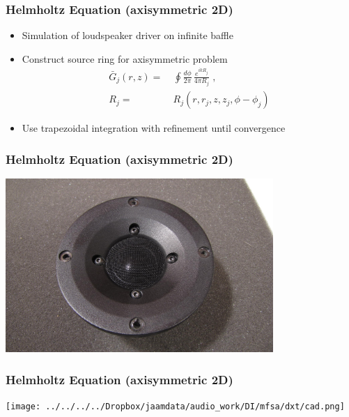 \begin{frame}
  \frametitle{Helmholtz Equation (axisymmetric 2D)\\
    }
  \begin{itemize}
  \item Simulation of loudspeaker driver on infinite baffle
  \item Construct source ring for axisymmetric problem
    \begin{align*}
      \bar{G}_j(r,z) = &~\oint \frac{d\phi}{2\pi} \, \frac{e^{i k R_j}}{4 \pi R_j} \; , \\
      R_j = &~R_j(r,r_j,z,z_j,\phi-\phi_j)
    \end{align*}
  \item Use trapezoidal integration with refinement until convergence
  \end{itemize}
\end{frame}


\begin{frame}
  \frametitle{Helmholtz Equation (axisymmetric 2D)\\
    }
  \begin{center}
    \includegraphics[width=4in]{figures/dxt_front.jpg}
  \end{center}
\end{frame}


\begin{frame}
  \frametitle{Helmholtz Equation (axisymmetric 2D)\\
    }
  \begin{center}
    \texttt{[image: ../../../../Dropbox/jaamdata/audio\_work/DI/mfsa/dxt/cad.png]}
  \end{center}
\end{frame}

